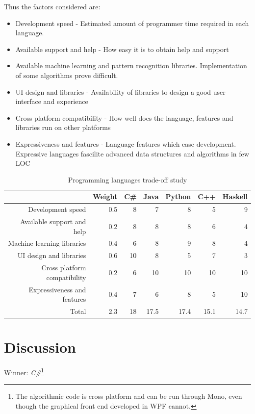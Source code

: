 Thus the factors considered are:
\begin{itemize}
\item Development speed - Estimated amount of programmer time required in each language.
\item Available support and help - How easy it is to obtain help and support
\item Available machine learning and pattern recognition libraries. Implementation of some algorithms prove difficult.
\item \ac{UI} design and libraries - Availability of libraries to design a good user interface and experience
\item Cross platform compatibility - How well does the language, features and libraries run on other platforms
\item Expressiveness and features - Language features which ease development. Expressive languages fascilite advanced data structures and algorithms in few \ac{LOC}
\end{itemize}

\begin{table}[htbp]
  \centering
  \caption{Programming languages trade-off study}
    \begin{tabular}{rr|rrrrr}
    \toprule
          & Weight & C\#   & Java  & Python & C++   & Haskell \\
    \midrule
    Development speed & 0.5   & 8     & 7     & 8     & 5     & 9 \\
    Available support and help & 0.2   & 8     & 8     & 8     & 6     & 4 \\
    Machine learning libraries & 0.4   & 6     & 8     & 9     & 8     & 4 \\
    \acs{UI} design and libraries & 0.6   & 10    & 8     & 5     & 7     & 3 \\
    Cross platform compatibility & 0.2   & 6     & 10    & 10    & 10    & 10 \\
    Expressiveness and features & 0.4   & 7     & 6     & 8     & 5     & 10 \\
    \midrule
    Total & 2.3   & 18    & 17.5  & 17.4  & 15.1  & 14.7 \\
    \bottomrule
    \end{tabular}%
  \label{tab:languagetradeoff}%
\end{table}%

\section{Discussion}
Winner: \emph{C\#}\footnote{The algorithmic code is cross platform and can be run through Mono, even though the graphical front end developed in \ac{WPF} cannot.}

